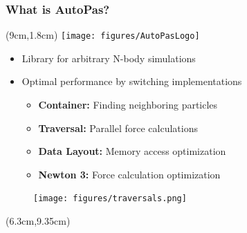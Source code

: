 \documentclass[
	10pt,
	t		%
]{beamer}
\begin{document}
\begin{frame}
    \frametitle{What is AutoPas?}

    \begin{textblock*}{5cm}(9cm,1.8cm)
        \texttt{[image: figures/AutoPasLogo]}
    \end{textblock*}

    \begin{itemize}
        \item Library for arbitrary N-body simulations
        \item Optimal performance by switching implementations
              \begin{itemize}
                  \item \textbf{Container:} Finding neighboring particles
                  \item \textbf{Traversal:} Parallel force calculations
                  \item \textbf{Data Layout:} Memory access optimization
                  \item \textbf{Newton 3:} Force calculation optimization
              \end{itemize}
    \end{itemize}

    \vspace{-0.1cm}
    \begin{figure}
        \centering
        \texttt{[image: figures/traversals.png]}
    \end{figure}

    \begin{textblock*}{5cm}(6.3cm,9.35cm)
        \tiny{\cite{SIAM_PP24}}
    \end{textblock*}

\end{frame}
\end{document}
